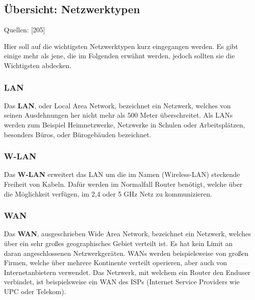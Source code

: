 \documentclass[12pt,a4paper]{report}
\begin{document}
\begin{onehalfspace}
\subsection{Übersicht: Netzwerktypen}
\begin{flushright}
\begin{tiny}
Quellen: [205]
\end{tiny}
\end{flushright}
Hier soll auf die wichtigsten Netzwerktypen kurz eingegangen werden. Es gibt einige mehr als jene, die im Folgenden erwähnt werden, jedoch sollten sie die Wichtigsten abdecken.
\subsubsection{LAN}
Das \textbf{LAN}, oder Local Area Network, bezeichnet ein Netzwerk, welches von seinen Ausdehnungen her nicht mehr als 500 Meter überschreitet. Als LANs werden zum Beispiel Heimnetzwerke, Netzwerke in Schulen oder Arbeitsplätzen, besonders Büros, oder Bürogebäuden bezeichnet.
\subsubsection{W-LAN}
Das \textbf{W-LAN} erweitert das LAN um die im Namen (Wireless-LAN) steckende Freiheit von Kabeln. Dafür werden im Normalfall Router benötigt, welche über die Möglichkeit verfügen, im 2,4 oder 5 GHz Netz zu kommunizieren.
\subsubsection{WAN}
Das \textbf{WAN}, ausgeschrieben Wide Area Network, bezeichnet ein Netzwerk, welches über ein sehr großes geographisches Gebiet verteilt ist. Es hat kein Limit an daran angeschlossenen Netzwerkgeräten. WANs werden beispielsweise von großen Firmen, welche über mehrere Kontinente verteilt operieren, aber auch von Internetanbietern verwendet. Das Netzwerk, mit welchem ein Router den Enduser verbindet, ist beispielsweise ein WAN des ISPs (Internet Service Providers wie UPC oder Telekom). 

\end{onehalfspace}
\end{document}
